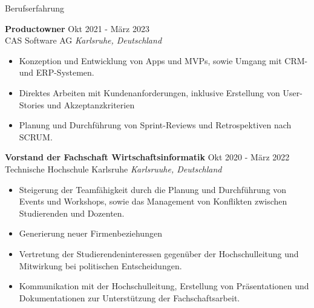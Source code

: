 \documentclass{resume} %
\begin{document}

\begin{rSection}{Berufserfahrung}

    \textbf{Productowner} \hfill Okt 2021 - März 2023\\
    CAS Software AG \hfill \textit{Karlsruhe, Deutschland}
    \begin{itemize}
        \itemsep -3pt {}
        \item \raggedright{Konzeption und Entwicklung von Apps und MVPs, sowie Umgang mit CRM- und ERP-Systemen.}
        \item \raggedright{Direktes Arbeiten mit Kundenanforderungen, inklusive Erstellung von User-Stories und Akzeptanzkriterien}
        \item \raggedright{Planung und Durchführung von Sprint-Reviews und Retrospektiven nach SCRUM.}
    \end{itemize}

    \textbf{Vorstand der Fachschaft Wirtschaftsinformatik} \hfill Okt 2020 - März 2022\\
    Technische Hochschule Karlsruhe \hfill \textit{Karlsruuhe, Deutschland}
    \begin{itemize}
        \itemsep -3pt {}
        \item \raggedright{Steigerung der Teamfähigkeit durch die Planung und Durchführung von Events und Workshops, sowie das Management von Konflikten zwischen Studierenden und Dozenten.} 
        \item \raggedright{Generierung neuer Firmenbeziehungen}
        \item \raggedright{Vertretung der Studierendeninteressen gegenüber der Hochschulleitung und Mitwirkung bei politischen Entscheidungen.}
        \item \raggedright{Kommunikation mit der Hochschulleitung, Erstellung von Präsentationen und Dokumentationen zur Unterstützung der Fachschaftsarbeit.}
    \end{itemize}
\end{rSection}
\end{document}
